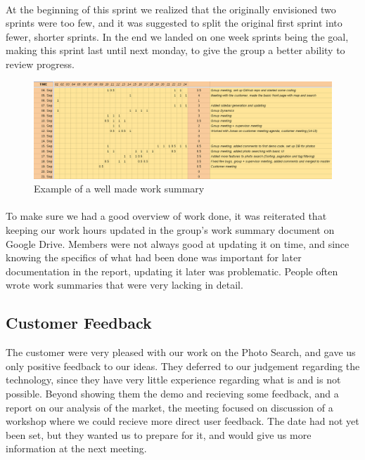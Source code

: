 \paragraph{} At the beginning of this sprint we realized that the originally envisioned two sprints were too few, and it was suggested to split the original first sprint into fewer, shorter sprints. In the end we landed on one week sprints being the goal, making this sprint last until next monday, to give the group a better ability to review progress.

\begin{figure}[ht!]
  \includegraphics[width=\linewidth]{./img/WorkSheetExample}
  \caption{Example of a well made work summary}
\end{figure}


\paragraph{} To make sure we had a good overview of work done, it was reiterated that keeping our work hours updated in the group's work summary document on Google Drive. Members were not always good at updating it on time, and since knowing the specifics of what had been done was important for later documentation in the report, updating it later was problematic. People often wrote work summaries that were very lacking in detail.

\subsection{Customer Feedback}
\label{subsec:S1RetrospectiveCustomerFeedback}
The customer were very pleased with our work on the Photo Search, and gave us only positive feedback to our ideas. They deferred to our judgement regarding the technology, since they have very little experience regarding what is and is not possible. Beyond showing them the demo and recieving some feedback, and a report on our analysis of the market, the meeting focused on discussion of a workshop where we could recieve more direct user feedback. The date had not yet been set, but they wanted us to prepare for it, and would give us more information at the next meeting.